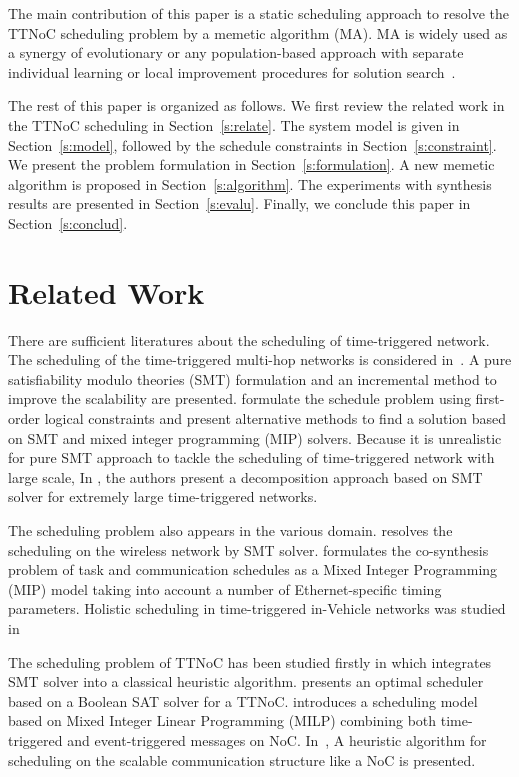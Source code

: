 \documentclass[journal]{IEEEtran}
\theoremstyle{remark}
\begin{document}
The main contribution of this paper is a static scheduling approach to resolve the TTNoC scheduling problem by a memetic algorithm (MA). 
MA is widely used as a synergy of evolutionary or any population-based approach with separate individual learning or local improvement procedures for solution search~\cite{DBLP:journals/tec/ChenOLT11}. 

The rest of this paper is organized as follows. 
We first review the related work in the TTNoC scheduling in Section~\ref{s:relate}. 
The system model is given in Section~\ref{s:model},
 followed by the schedule constraints in Section~\ref{s:constraint}.
We present the problem formulation in Section~\ref{s:formulation}.
A new memetic algorithm is proposed in Section~\ref{s:algorithm}.
The experiments with synthesis results are presented in Section~\ref{s:evalu}.
Finally, we conclude this paper in Section~\ref{s:conclud}.

\section{Related Work	\label{s:relate}}

There are sufficient literatures about the scheduling of time-triggered network.
The scheduling of the time-triggered multi-hop networks is considered in~\cite{DBLP:conf/rtss/Steiner10}.
A pure satisfiability modulo theories (SMT) formulation and an incremental method to improve the scalability are presented.
\cite{DBLP:journals/rts/CraciunasO16,DBLP:conf/rtns/CraciunasO14} formulate the schedule problem using first-order logical constraints and present alternative methods to find a solution based on SMT and mixed integer programming (MIP) solvers.
Because it is unrealistic for pure SMT approach to tackle the scheduling of time-triggered network with large scale,
 In \cite{DBLP:conf/etfa/PozoSRH15},
  the authors present a decomposition approach based on SMT solver for extremely large time-triggered networks.

The scheduling problem also appears in the various domain.
\cite{DBLP:conf/isorc/RoRM15} resolves the scheduling on the wireless network by SMT solver.
\cite{DBLP:conf/aspdac/ZhangG0C14} formulates the co-synthesis problem of task and communication schedules as a Mixed Integer Programming (MIP) model taking into account a number of Ethernet-specific timing parameters.
Holistic scheduling in time-triggered in-Vehicle networks was studied in~\cite{DBLP:journals/tii/HuLWLZ14}

The scheduling problem of TTNoC has been
studied firstly in \cite{DBLP:conf/date/HuangBRBK12} which integrates SMT solver into a classical heuristic algorithm. 
\cite{DBLP:conf/sies/ScholerKMO15} presents an optimal scheduler based on a Boolean SAT solver for a TTNoC.
\cite{DBLP:conf/indin/MurshedOAK15} introduces a scheduling model based on Mixed Integer Linear Programming (MILP) combining both time-triggered and event-triggered messages on NoC.
In~\cite{DBLP:conf/sies/FreierC15},
 A heuristic algorithm for scheduling on the scalable communication structure like a NoC is presented. 
\end{document}

